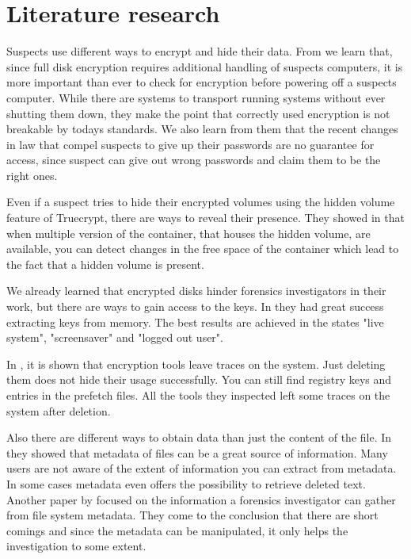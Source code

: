 \section{Literature research}

Suspects use different ways to encrypt and hide their data. From \cite{Casey2011129} we learn that, since full disk encryption requires additional handling of suspects computers, it is more important than ever to check for encryption before powering off a suspects computer. While there are systems to transport running systems without ever shutting them down, they make the point that correctly used encryption is not breakable by todays standards.  We also learn from them that the recent changes in law that compel suspects to give up their passwords are no guarantee for access, since suspect can give out wrong passwords and claim them to be the right ones. 

Even if a suspect tries to hide their encrypted volumes using the hidden volume feature of Truecrypt, there are ways to reveal their presence.  They showed in \cite{Hargreaves2010} that when multiple version of the container, that houses the hidden volume, are available, you can detect changes in the free space of the container which lead to the fact that a hidden volume is present.

We already learned that encrypted disks hinder forensics investigators in their work, but there are ways to gain access to the keys. In \cite{MaartmannMoe2009S132} they had great success extracting keys from memory. The best results are achieved in the states "live system", "screensaver" and "logged out user".

In \cite{5563320}, it is shown that encryption tools leave traces on the system. Just deleting them does not hide their usage successfully. You can still find registry keys and entries in the prefetch files. All the tools they inspected left some traces on the system after deletion.

Also there are different ways to obtain data than just the content of the file. In \cite{Castiglione2007750} they showed that metadata of files can be a great source of information. Many users are not aware of the extent of information you can extract from metadata. In some cases metadata even offers the possibility to retrieve deleted text. Another paper by \cite{Buchholz2004298} focused on the information a forensics investigator can gather from file system metadata. They come to the conclusion that there are short comings and since the metadata can be manipulated, it only helps the investigation to some extent.

